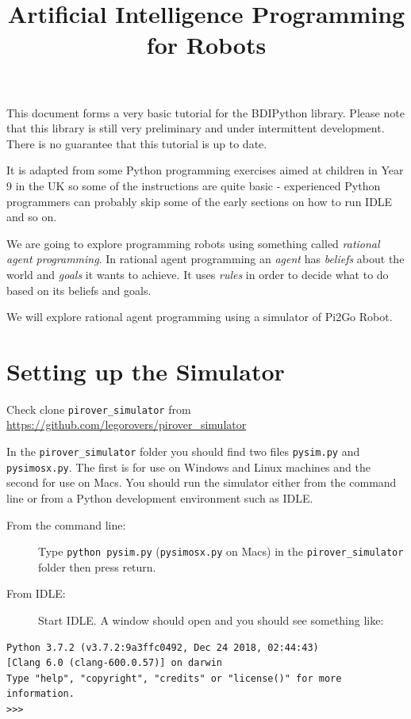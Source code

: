 \documentclass[a4,12pt]{article}
\title{Artificial Intelligence Programming for Robots}
\begin{document}
\maketitle

This document forms a very basic tutorial for the BDIPython library.  Please note that this library is still very preliminary and under intermittent development.  There is no guarantee that this tutorial is up to date.

It is adapted from some Python programming exercises aimed at children in Year 9 in the UK so some of the instructions are quite basic - experienced Python programmers can probably skip some of the early sections on how to run IDLE and so on.  

We are going to explore programming robots using something called \emph{rational agent programming}.  In rational agent programming an \emph{agent} has \emph{beliefs} about the world and \emph{goals} it wants to achieve.  It uses \emph{rules} in order to decide what to do based on its beliefs and goals.

We will explore rational agent programming using a simulator of Pi2Go Robot.

\section{Setting up the Simulator}

Check clone \lstinline{pirover_simulator} from \url{https://github.com/legorovers/pirover_simulator}

In the \lstinline{pirover_simulator} folder you should find two files \lstinline{pysim.py} and \lstinline{pysimosx.py}.  The first is for use on Windows and Linux machines and the second for use on Macs.
You should run the simulator either from the command line or from a Python development environment such as IDLE.  

\begin{description}
\item[From the command line:]  Type \lstinline{python pysim.py} (\lstinline{pysimosx.py} on Macs) in the \lstinline{pirover_simulator} folder then press return.  

\item[From IDLE:] Start IDLE.  A window should open and you should see something like:
\end{description}

\begin{verbatim}
Python 3.7.2 (v3.7.2:9a3ffc0492, Dec 24 2018, 02:44:43) 
[Clang 6.0 (clang-600.0.57)] on darwin
Type "help", "copyright", "credits" or "license()" for more information.
>>>  
\end{verbatim}
\end{document}
